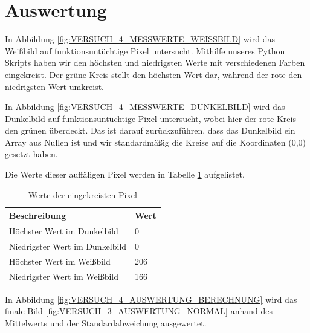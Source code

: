 \documentclass[12pt, oneside, a4paper, \docLanguage]{report}
\begin{document}
\section{Auswertung}
\label{chap:VERSUCH_4_AUSWERTUNG}

In Abbildung \ref{fig:VERSUCH_4_MESSWERTE_WEISSBILD} wird das Weißbild auf funktionsuntüchtige Pixel untersucht. Mithilfe unseres Python Skripts haben wir den höchsten und niedrigsten Werte mit verschiedenen Farben eingekreist. Der grüne Kreis stellt den höchsten Wert dar, während der rote den niedrigsten Wert umkreist.

In Abbildung \ref{fig:VERSUCH_4_MESSWERTE_DUNKELBILD} wird das Dunkelbild auf funktionsuntüchtige Pixel untersucht, wobei hier der rote Kreis den grünen überdeckt. Das ist darauf zurückzuführen, dass das Dunkelbild ein Array aus Nullen ist und wir standardmäßig die Kreise auf die Koordinaten (0,0) gesetzt haben.

Die Werte dieser auffäligen Pixel werden in Tabelle \ref{fig:VERSUCH_4_AUSWERTUNG_TABELLE} aufgelistet.

\begin{table}[H]
\centering\small
\begin{tabular}{|l|l|}
\hline
\textbf{Beschreibung}               & \textbf{Wert} \\ \hline
Höchster Wert im Dunkelbild    & 0                     \\ \hline
Niedrigster Wert im Dunkelbild & 0                     \\ \hline
Höchster Wert im Weißbild       & 206                 \\ \hline
Niedrigster Wert im Weißbild    & 166                 \\ \hline
\end{tabular}
\caption{Werte der eingekreisten Pixel}
\label{fig:VERSUCH_4_AUSWERTUNG_TABELLE}
\end{table}

In Abbildung \ref{fig:VERSUCH_4_AUSWERTUNG_BERECHNUNG} wird das finale Bild \ref{fig:VERSUCH_3_AUSWERTUNG_NORMAL} anhand des Mittelwerts und der Standardabweichung ausgewertet.
\end{document}
